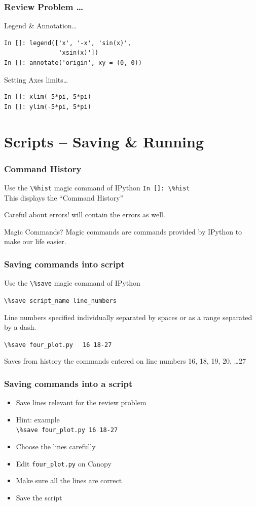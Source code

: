 \documentclass[14pt,compress]{beamer}
\newcounter{time}
\newcommand{\inctime}[1]{\addtocounter{time}{#1}{\tiny \thetime\ m}}
\newcommand{\typ}[1]{\lstinline{#1}}
\newcommand{\kwrd}[1]{ \texttt{\textbf{\color{blue}{#1}}}  }
\begin{document}
\begin{frame}[fragile]
\frametitle{Review Problem \ldots}
\alert{Legend \& Annotation\ldots}
\begin{lstlisting}
In []: legend(['x', '-x', 'sin(x)',
               'xsin(x)'])
In []: annotate('origin', xy = (0, 0))
\end{lstlisting}
\alert{Setting Axes limits\ldots}
\begin{lstlisting}
In []: xlim(-5*pi, 5*pi)
In []: ylim(-5*pi, 5*pi)
\end{lstlisting}
\inctime{5}
\end{frame}

\section{Scripts -- Saving \& Running}
\begin{frame}[fragile]
\frametitle{Command History}
Use the \typ{\%hist} \alert{magic} command of IPython
\typ{In []: \%hist}\\
This displays the ``Command History''
\begin{block}{Careful about errors!}
  \kwrd{\%hist} will contain the errors as well.\\
\end{block}
\pause
\begin{block}{Magic Commands?}
  Magic commands are commands provided by IPython to make our life easier.
\end{block}
\end{frame}

\begin{frame}[fragile]
  \frametitle{Saving commands into script}
Use the \typ{\%save} \alert{magic} command of IPython
\begin{block}{}
\typ{\%save script_name line_numbers}
\end{block}
Line numbers specified individually separated by spaces or as a range separated by a dash.\\
\begin{block}{}
\typ{\%save four_plot.py} \alert{\typ{  16 18-27}} \\
\end{block}
Saves from history the commands entered on line numbers \alert{16, 18, 19, 20, \ldots 27}
\end{frame}

\begin{frame}[fragile]
  \frametitle{Saving commands into a script}
  \begin{itemize}
  \item Save lines relevant for the review problem
  \item Hint: example\\ \typ{\%save four_plot.py 16 18-27}
  \item Choose the lines carefully
  \item Edit \typ{four_plot.py} on Canopy
  \item Make sure all the lines are correct
  \item Save the script
  \end{itemize}
\inctime{5}
\end{frame}
\end{document}
